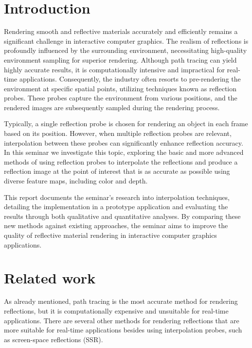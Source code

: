 \section{Introduction}

Rendering smooth and reflective materials accurately and efficiently remains a significant challenge in interactive computer graphics. The realism of reflections is profoundly influenced by the surrounding environment, necessitating high-quality environment sampling for superior rendering. Although path tracing can yield highly accurate results, it is computationally intensive and impractical for real-time applications. Consequently, the industry often resorts to pre-rendering the environment at specific spatial points, utilizing techniques known as reflection probes. These probes capture the environment from various positions, and the rendered images are subsequently sampled during the rendering process.

Typically, a single reflection probe is chosen for rendering an object in each frame based on its position. However, when multiple reflection probes are relevant, interpolation between these probes can significantly enhance reflection accuracy. In this seminar we investigate this topic, exploring the basic and more advanced methods of using reflection probes to interpolate the reflections and produce a reflection image at the point of interest that is as accurate as possible using diverse feature maps, including color and depth.

This report documents the seminar's research into interpolation techniques, detailing the implementation in a prototype application and evaluating the results through both qualitative and quantitative analyses. By comparing these new methods against existing approaches, the seminar aims to improve the quality of reflective material rendering in interactive computer graphics applications.

\section{Related work}

As already mentioned, path tracing is the most accurate method for rendering reflections, but it is computationally expensive and unsuitable for real-time applications.
There are several other methods for rendering reflections that are more suitable for real-time applications besides using interpolation probes, such as screen-space reflections (SSR). 

